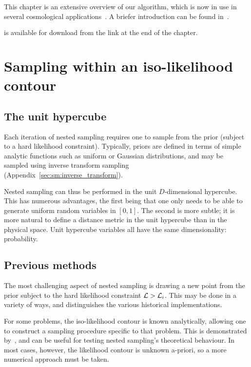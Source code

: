 This chapter is an extensive overview of our algorithm, which is now in use in several cosmological applications~\citep{planck2015-a24}. A briefer introduction can be found in~\cite{polychordletter}.

\PolyChord{} is available for download from the link at the end of the chapter.







\section{Sampling within an iso-likelihood contour}
\label{sec:pc:iso_likelihood_sampling}

\subsection{The unit hypercube}
\label{sec:bay:unit_hypercube}
Each iteration of nested sampling requires one to sample from the prior (subject to a hard likelihood constraint). 
Typically, priors are defined in terms of simple analytic functions such as uniform or Gaussian distributions, and may be sampled using  inverse transform sampling (Appendix~\ref{sec:sm:inverse_transform}). 

Nested sampling can thus be performed in the unit \(D\)-dimensional hypercube. This has numerous advantages, the first being that one only needs to be able to generate uniform random variables in \([0,1]\). The second is more subtle; it is more natural to define a distance metric in the unit hypercube than in the physical space. Unit hypercube variables all have the same dimensionality: probability.



\subsection{Previous methods}
\label{sec:pc:previous_methods}
The most challenging aspect of nested sampling is drawing a new point from the prior subject to the hard likelihood constraint \(\mathcal{L}>\mathcal{L}_i\). This may be done in a variety of ways, and distinguishes the various historical implementations.

For some problems, the iso-likelihood contour is known analytically, allowing one to construct a sampling procedure specific to that problem. This is demonstrated by~\cite{Keeton}, and can be useful for testing nested sampling's theoretical behaviour. In most cases, however, the likelihood contour is unknown a-priori, so a more numerical approach must be taken.

